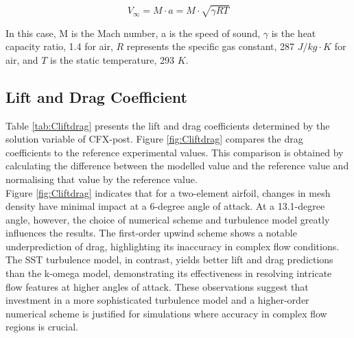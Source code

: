 \begin{equation}
V_{\infty} = M \cdot a = M \cdot \sqrt{\gamma R T}
\end{equation}

In this case, M is the Mach number, a is the speed of sound, $\gamma$ is the heat capacity ratio, 1.4 for air, $R$ represents the specific gas constant, 287 $J/kg \cdot K$ for air, and $T$ is the static temperature, 293 $K$.

\subsection{Lift and Drag Coefficient}
Table \ref{tab:Cliftdrag} presents the lift and drag coefficients determined by the solution variable of CFX-post. Figure \ref{fig:Cliftdrag} compares the drag coefficients to the reference experimental values. This comparison is obtained by calculating the difference between the modelled value and the reference value and normalising that value by the reference value. \\

Figure \ref{fig:Cliftdrag} indicates that for a two-element airfoil, changes in mesh density have minimal impact at a 6-degree angle of attack. At a 13.1-degree angle, however, the choice of numerical scheme and turbulence model greatly influences the results. The first-order upwind scheme shows a notable underprediction of drag, highlighting its inaccuracy in complex flow conditions. The SST turbulence model, in contrast, yields better lift and drag predictions than the k-omega model, demonstrating its effectiveness in resolving intricate flow features at higher angles of attack. These observations suggest that investment in a more sophisticated turbulence model and a higher-order numerical scheme is justified for simulations where accuracy in complex flow regions is crucial.



